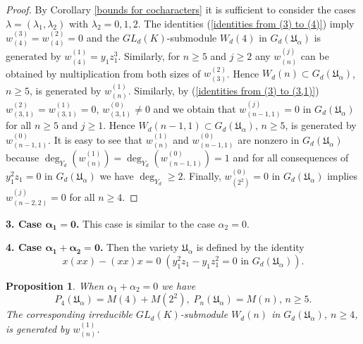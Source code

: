 \documentclass{amsart}
\newtheorem{proposition}[theorem]{Proposition}
\theoremstyle{definition}
\begin{document}
\begin{proof}
By Corollary \ref{bounds for cocharacters} it is sufficient to consider the cases $\lambda=(\lambda_1,\lambda_2)$ with $\lambda_2=0,1,2$.
The identities (\ref{identities from (3) to (4)}) imply $w_{(4)}^{(3)}=w_{(4)}^{(2)}=0$
and the $GL_d(K)$-submodule $W_d(4)$ in $G_d({\mathfrak U}_{\alpha})$ is generated by $w_{(4)}^{(1)}=y_1z_1^3$.
Similarly, for $n\geq 5$ and $j\geq 2$ any $w_{(n)}^{(j)}$ can be obtained by multiplication from both sizes of $w_{(3)}^{(2)}$.
Hence $W_d(n)\subset G_d({\mathfrak U}_{\alpha})$, $n\geq 5$, is generated by $w_{(n)}^{(1)}$.
Similarly, by (\ref{identities from (3) to (3,1)}) $w_{(3,1)}^{(2)}=w_{(3,1)}^{(1)}=0$, $w_{(3,1)}^{(0)}\not=0$ and we obtain that
$w_{(n-1,1)}^{(j)}=0$ in $G_d({\mathfrak U}_{\alpha})$ for all $n\geq 5$ and $j\geq 1$. Hence $W_d(n-1,1)\subset G_d({\mathfrak U}_{\alpha})$, $n\geq 5$, is generated by $w_{(n-1,1)}^{(0)}$.
It is easy to see that $w_{(n)}^{(1)}$ and $w_{(n-1,1)}^{(0)}$ are nonzero in $G_d({\mathfrak U}_{\alpha})$ because $\deg_{Y_d}(w_{(n)}^{(1)})=\deg_{Y_d}(w_{(n-1,1)}^{(0)})=1$
and for all consequences of $y_1^2z_1=0$ in $G_d({\mathfrak U}_{\alpha})$ we have $\deg_{Y_d}\geq 2$.
Finally, $w_{(2^2)}^{(0)}=0$ in $G_d({\mathfrak U}_{\alpha})$ implies $w_{(n-2,2)}^{(j)}=0$ for all $n\geq 4$.
\end{proof}

{\bf 3. Case $\bm{\alpha_1=0}$.} This case is similar to the case $\alpha_2=0$.

{\bf 4. Case $\bm{\alpha_1+\alpha_2=0}$.} Then the variety ${\mathfrak U}_{\alpha}$ is defined by the identity
\[
x(xx)-(xx)x=0\;(y_1^2z_1-y_1z_1^2=0\text{ in }G_d({\mathfrak U}_{\alpha})).
\]

\begin{proposition}\label{chi for alpha1+alpha2=0}
When $\alpha_1+\alpha_2=0$ we have
\[
P_4({\mathfrak U}_{\alpha})=M(4)+M(2^2),\; P_n({\mathfrak U}_{\alpha})=M(n),\,n\geq 5.
\]
The corresponding irreducible $GL_d(K)$-submodule $W_d(n)$ in $G_d({\mathfrak U}_{\alpha})$, $n\geq 4$, is generated by $w_{(n)}^{(1)}$.
\end{proposition}
\end{document}
